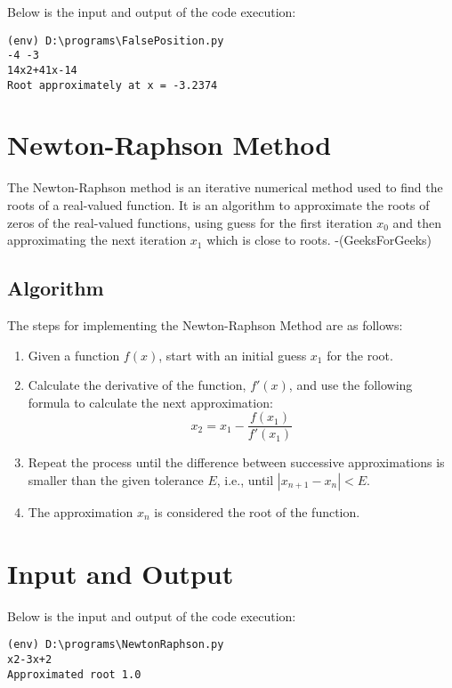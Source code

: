 \documentclass[12pt]{article}
\begin{document}
    \noindent Below is the input and output of the code execution:
    
    {\small
    \begin{verbatim}
(env) D:\programs\FalsePosition.py
-4 -3   
14x2+41x-14
Root approximately at x = -3.2374
    \end{verbatim}
    }

    \newpage
    \section*{Newton-Raphson Method}

    The Newton-Raphson method is an iterative numerical method used to find the roots of a real-valued function. It is an algorithm to approximate the roots of zeros of the real-valued functions, using guess for the first iteration \(x_0\) and then approximating the next iteration \(x_1\) which is close to roots. -(GeeksForGeeks)
    \subsection*{Algorithm}
    The steps for implementing the Newton-Raphson Method are as follows:

    \begin{enumerate}
        \item Given a function \( f(x) \), start with an initial guess \( x_1 \) for the root.
        \item Calculate the derivative of the function, \( f'(x) \), and use the following formula to calculate the next approximation:
        \[
            x_2 = x_1 - \frac{f(x_1)}{f'(x_1)}
        \]
        \item Repeat the process until the difference between successive approximations is smaller than the given tolerance \( E \), i.e., until \( |x_{n+1} - x_n| < E \).
        \item The approximation \( x_n \) is considered the root of the function.
    \end{enumerate}

    \section*{Input and Output}

    \noindent Below is the input and output of the code execution:

    {\small
    \begin{verbatim}
(env) D:\programs\NewtonRaphson.py
x2-3x+2
Approximated root 1.0
    \end{verbatim}
    }
\end{document}
